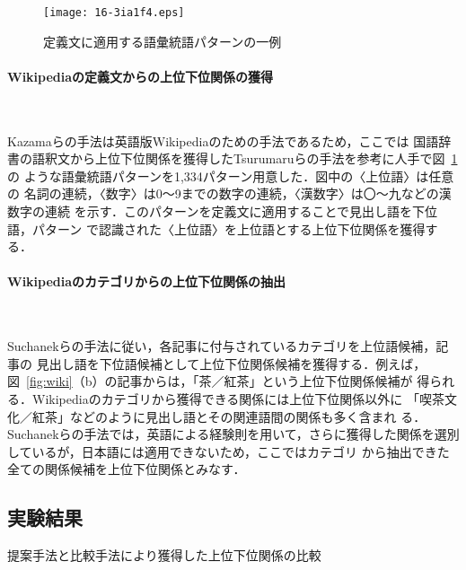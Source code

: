\documentclass[japanese]{jnlp_1.4}
\begin{document}
\begin{figure}[b]
\begin{center}
\texttt{[image: 16-3ia1f4.eps]}
\end{center}
    \caption{定義文に適用する語彙統語パターンの一例}
    \label{fig:def_pattern}
\end{figure}

\paragraph{Wikipediaの定義文からの上位下位関係の獲得}\label{sec:definition}~~

Kazamaらの手法は英語版Wikipediaのための手法であるため，ここでは
国語辞書の語釈文から上位下位関係を獲得したTsurumaruらの手法を参考に人手で図~\ref{fig:def_pattern}の
ような語彙統語パターンを1,334パターン用意した\cite{Tsurumaru_1986,Kazama_2007}．図中の〈上位語〉は任意の
名詞の連続，〈数字〉は0〜9までの数字の連続，〈漢数字〉は〇〜九などの漢数字の連続
を示す．このパターンを定義文に適用することで見出し語を下位語，パターン
で認識された〈上位語〉を上位語とする上位下位関係を獲得する．


\paragraph{Wikipediaのカテゴリからの上位下位関係の抽出}~~

Suchanekらの手法に従い，各記事に付与されているカテゴリを上位語候補，記事の
見出し語を下位語候補として上位下位関係候補を獲得する．例えば，
図~\ref{fig:wiki}（b）の記事からは，「茶／紅茶」という上位下位関係候補が
得られる．Wikipediaのカテゴリから獲得できる関係には上位下位関係以外に
「喫茶文化／紅茶」などのように見出し語とその関連語間の関係も多く含まれ
る．Suchanekらの手法では，英語による経験則を用いて，さらに獲得した関係を選別しているが，日本語には適用できないため，ここではカテゴリ
から抽出できた全ての関係候補を上位下位関係とみなす．


\subsection{実験結果}\label{sec:exp_result}

\begin{table}[b]
\caption{提案手法と比較手法により獲得した上位下位関係の比較}
\label{tab:Method1Result}

\end{table}
\end{document}
